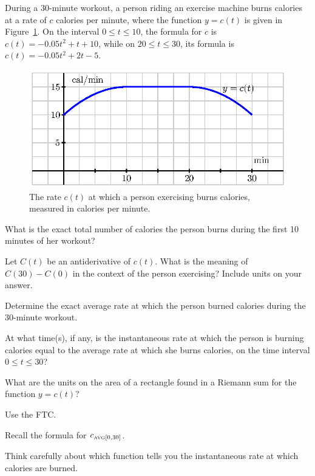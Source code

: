 \begin{activity} \label{A:4.4.3}  During a 30-minute workout, a person riding an exercise machine burns calories at a rate of $c$ calories per minute, where the function $y = c(t)$ is given in Figure~\ref{F:4.4.Act3}.  On the interval $0 \le t \le 10$, the formula for $c$ is $c(t) = -0.05t^2 + t + 10$, while on $20 \le t \le 30$, its formula is $c(t) = -0.05t^2 + 2t - 5$.
\begin{figure}[h]
\begin{center}
\includegraphics{figures/4_4_Act3.eps}
\caption{The rate $c(t)$ at which a person exercising burns calories, measured in calories per minute.} \label{F:4.4.Act3}
\end{center}
\end{figure}
\ba
	\item What is the exact total number of calories the person burns during the first 10 minutes of her workout?
	\item Let $C(t)$ be an antiderivative of $c(t)$.  What is the meaning of $C(30) - C(0)$ in the context of the person exercising?  Include units on your answer.
	\item Determine the exact average rate at which the person burned calories during the 30-minute workout.
	\item At what time(s), if any, is the instantaneous rate at which the person is burning calories equal to the average rate at which she burns calories, on the time interval $0 \le t \le 30$?
\ea
\end{activity}
\begin{smallhint}
\ba
	\item What are the units on the area of a rectangle found in a Riemann sum for the function $y= c(t)$?
	\item Use the FTC.
	\item Recall the formula for $c_{\mbox{\tiny{AVG}}[0,30]}$.
	\item Think carefully about which function tells you the instantaneous rate at which calories are burned.
\ea
\end{smallhint}
